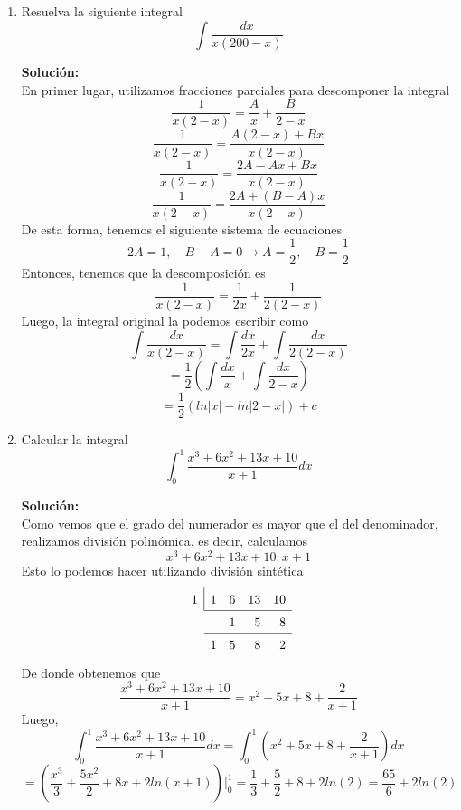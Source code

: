 \documentclass[12pt]{article}
\newenvironment{solucion}
{\begin{mdframed}[backgroundcolor=black!10]
		{\bf Solución:}\\
	}
	{
	\end{mdframed}
}
\newenvironment{preguntas}
{\begin{enumerate}\itemsep12pt
	}
	{
	\end{enumerate}
}
\newcommand{\ev}{\Big|}
\newcommand{\ra}{\rightarrow}
\begin{document}
\begin{preguntas}
\begin{solucion}
\begin{enumerate}[a)]
\end{enumerate}
\end{solucion}
\item Resuelva la siguiente integral
	$$\displaystyle\int \dfrac{dx}{x(200-x)}$$
\begin{solucion}
En primer lugar, utilizamos fracciones parciales para descomponer la integral
		$$\dfrac{1}{x(2-x)} = \dfrac{A}{x} + \dfrac{B}{2-x}$$
		$$\dfrac{1}{x(2-x)} = \dfrac{A(2-x) + Bx}{x(2-x)}$$
		$$\dfrac{1}{x(2-x)} = \dfrac{2A-Ax + Bx}{x(2-x)}$$
		$$\dfrac{1}{x(2-x)} = \dfrac{2A+ (B-A)x}{x(2-x)}$$
		De esta forma, tenemos el siguiente sistema de ecuaciones
		$$2A = 1, \quad B-A = 0 \ra A = \dfrac{1}{2}, \quad B = \dfrac{1}{2}$$
		Entonces, tenemos que la descomposición es
		$$\dfrac{1}{x(2-x)} = \dfrac{1}{2x} + \dfrac{1}{2(2-x)}$$
		Luego, la integral original la podemos escribir como
		$$\displaystyle\int \dfrac{dx}{x(2-x)} = \displaystyle\int \dfrac{dx}{2x} + \displaystyle\int \dfrac{dx}{2(2-x)}$$
		$$ = \dfrac{1}{2} \left( \displaystyle\int \dfrac{dx}{x} + \displaystyle\int \dfrac{dx}{2-x} \right)$$
		$$ = \dfrac{1}{2} (ln|x| - ln|2-x| ) + c$$
\end{solucion}
\item Calcular la integral
	$$\displaystyle\int_0^1 \dfrac{x^3+6x^2+13x+10}{x+1}dx$$
\begin{solucion}
Como vemos que el grado del numerador es mayor que el del denominador, realizamos división polinómica, es decir, calculamos
		$$x^3+6x^2+13x+10 : x+1$$
		Esto lo podemos hacer utilizando división sintética
		$$
		\renewcommand\arraystretch{1.5}
		\setlength\doublerulesep{0pt}
		\begin{array}{rrrrr}
		\multicolumn{1}{r|}{1} & 1 & 6 & 13 & 10\\\cline{2-5}
		& & 1& 5 & 8 \\\cline{2-5}
		& 1 & 5& 8 & 2 
		\end{array}
		$$
		De donde obtenemos que
		$$\dfrac{x^3+6x^2+13x+10}{x+1} = x^2 +5x + 8 + \dfrac{2}{x+1}$$
		Luego,
		$$\displaystyle\int_0^1 \dfrac{x^3+6x^2+13x+10}{x+1}dx = \displaystyle\int_0^1 \left(x^2 + 5x + 8 +  \dfrac{2}{x+1}\right)dx$$
		$$= \left( \dfrac{x^3}{3} + \dfrac{5x^2}{2} + 8x + 2ln(x+1)\right) \ev_0^1 = \dfrac{1}{3} + \dfrac{5}{2} + 8 + 2ln(2) = \dfrac{65}{6} + 2 ln(2)$$
\end{solucion}
\end{preguntas}
\end{document}
